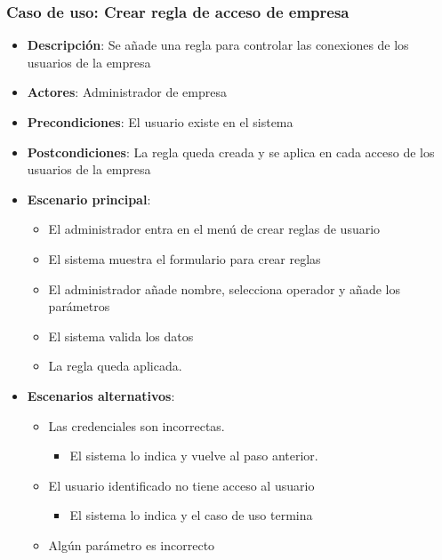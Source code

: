 \documentclass[12pt,a4paperpaper,]{report}
\providecommand{\tightlist}{%
  \setlength{\itemsep}{0pt}\setlength{\parskip}{0pt}}
\begin{document}
\subsubsection{Caso de uso: Crear regla de acceso de
empresa}\label{caso-de-uso-crear-regla-de-acceso-de-empresa}

\begin{itemize}
\tightlist
\item
  \textbf{Descripción}: Se añade una regla para controlar las conexiones
  de los usuarios de la empresa
\item
  \textbf{Actores}: Administrador de empresa
\item
  \textbf{Precondiciones}: El usuario existe en el sistema
\item
  \textbf{Postcondiciones}: La regla queda creada y se aplica en cada
  acceso de los usuarios de la empresa
\item
  \textbf{Escenario principal}:

  \begin{itemize}
  \tightlist
  \item
    El administrador entra en el menú de crear reglas de usuario
  \item
    El sistema muestra el formulario para crear reglas
  \item
    El administrador añade nombre, selecciona operador y añade los
    parámetros
  \item
    El sistema valida los datos
  \item
    La regla queda aplicada.
  \end{itemize}
\item
  \textbf{Escenarios alternativos}:

  \begin{itemize}
  \tightlist
  \item
    Las credenciales son incorrectas.

    \begin{itemize}
    \tightlist
    \item
      El sistema lo indica y vuelve al paso anterior.
    \end{itemize}
  \item
    El usuario identificado no tiene acceso al usuario

    \begin{itemize}
    \tightlist
    \item
      El sistema lo indica y el caso de uso termina
    \end{itemize}
  \item
    Algún parámetro es incorrecto


\end{itemize}
\end{itemize}
\end{document}
